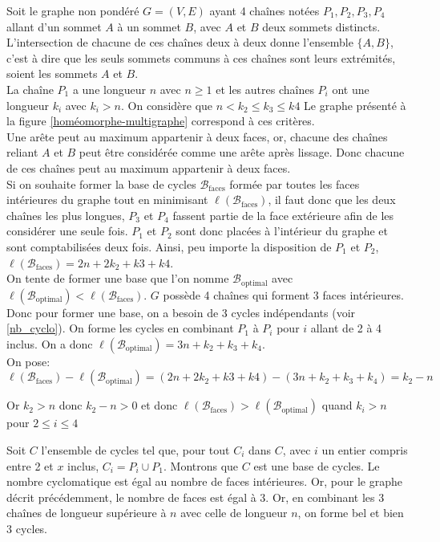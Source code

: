 \documentclass{article}
\begin{document}
Soit le graphe non pondéré $G=(V,E)$ ayant 4 chaînes notées $P_1, P_2, P_3, P_4$ allant d'un sommet $A$ à un sommet $B$, avec $A$ et $B$ deux sommets distincts. L'intersection de chacune de ces chaînes deux à deux donne l'ensemble $\{A,B\}$, c'est à dire que les seuls sommets communs à ces chaînes sont leurs extrémités, soient les sommets $A$ et $B$. \\

La chaîne $P_1$ a une longueur $n$ avec $n \ge 1$ et les autres chaînes $P_i$ ont une longueur $k_i$ avec $k_i > n$. On considère que $n < k_2 \le k_3 \le k4$ Le graphe présenté à la figure \ref{homéomorphe-multigraphe} correspond à ces critères. \\
Une arête peut au maximum appartenir à deux faces, or, chacune des chaînes reliant $A$ et $B$ peut être considérée comme une arête après lissage. Donc chacune de ces chaînes peut au maximum appartenir à deux faces. \\

Si on souhaite former la base de cycles $\mathcal{B}_{{\text{faces}}}$ formée par toutes les faces intérieures du graphe tout en minimisant $\ell(\mathcal{B}_{{\text{faces}}})$, il faut donc que les deux chaînes les plus longues, $P_3$ et $P_4$ fassent partie de la face extérieure afin de les considérer une seule fois. $P_1$ et $P_2$ sont donc placées à \og l'intérieur \fg du graphe et sont comptabilisées deux fois. Ainsi, peu importe la disposition de $P_1$ et $P_2$, $\ell(\mathcal{B}_{{\text{faces}}}) = 2n + 2k_2 + k3 + k4 $. \\

On tente de former une base que l'on nomme $\mathcal{B}_{{\text{optimal}}}$ avec $\ell(\mathcal{B}_{{\text{optimal}}}) < \ell(\mathcal{B}_{{\text{faces}}})$. $G$ possède 4 chaînes qui forment 3 faces intérieures. Donc pour former une base, on a besoin de 3 cycles indépendants (voir \ref{nb_cyclo}). On forme les cycles en combinant $P_1$ à $P_i$ pour $i$ allant de 2 à 4 inclus. On a donc $\ell(\mathcal{B}_{{\text{optimal}}}) = 3n + k_2 + k_3 + k_4$. \\
On pose:
\[ \ell(\mathcal{B}_{{\text{faces}}}) - \ell(\mathcal{B}_{{\text{optimal}}}) = (2n + 2k_2 + k3 + k4) - (3n + k_2 + k_3 + k_4) = k_2 - n \]

Or $k_2 > n$ donc $k_2 - n > 0$ et donc $\ell(\mathcal{B}_{{\text{faces}}}) > \ell(\mathcal{B}_{{\text{optimal}}})$ quand $k_i > n$ pour $ 2 \le i \le 4$

Soit $C$ l'ensemble de cycles tel que, pour tout $C_i$ dans $C$, avec $i$ un entier compris entre 2 et $x$ inclus, $C_i = P_i \cup  P_1 $. Montrons que $C$ est une base de cycles. Le nombre cyclomatique est égal au nombre de faces intérieures. Or, pour le graphe décrit précédemment, le nombre de faces est égal à 3. Or, en combinant les 3 chaînes de longueur supérieure à $n$ avec celle de longueur $n$, on forme bel et bien 3 cycles. \\
\end{document}
